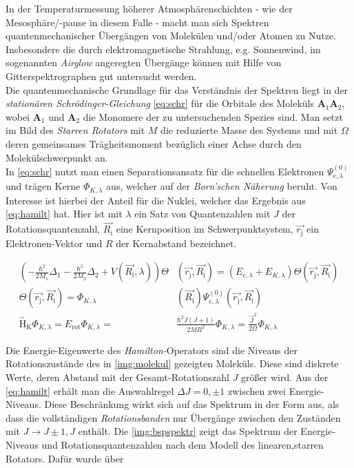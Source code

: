 \documentclass[numbers=noenddot,a4paper,notitlepage,twoside,BCOR15mm]{scrartcl}
\newcommand{\ix}[1]{_\text{#1}}
\newcommand{\tilt}[1]{\textit{#1}}
\newcommand{\fett}[1]{\textbf{#1}}
\newcommand{\OP}[1]{\hat{\mathrm{#1}}}
\begin{document}
		In der Temperaturmessung höherer Atmosphärenschichten - wie der Mesosphäre/-pause in diesem Falle -  macht man sich Spektren quantenmechanischer Übergängen von Molekülen und/oder Atomen zu Nutze. Insbesondere die durch elektromagnetische Strahlung, e.g. Sonnenwind, im sogenannten \tilt{Airglow} angeregten Übergänge können mit Hilfe von Gitterspektrographen gut untersucht werden.\\
		Die quantenmechanische Grundlage für das Verständnis der Spektren liegt in der \tilt{stationären Schrödinger-Gleichung} \autoref{eq:schr} für die Orbitale des Moleküls $\fett{A}\ix{1}\fett{A}\ix{2}$, wobei $\fett{A}\ix{1}$ und $\fett{A}\ix{2}$ die Monomere der zu untersuchenden Spezies sind. Man setzt im Bild des \tilt{Starren Rotators} mit $M$ die reduzierte Masse des Systems und mit $\Omega$ deren gemeinsames Trägheitsmoment bezüglich einer Achse durch den Molekülschwerpunkt an.\\
		In \autoref{eq:schr} nutzt man einen Separationsansatz für die schnellen Elektronen $\Psi_{e,\lambda}^{(0)}$ und trägen Kerne $\Phi_{K,\lambda}$ aus, welcher auf der \tilt{Born'schen Näherung} beruht. Von Interesse ist hierbei der Anteil für die Nuklei, welcher das Ergebnis aus \autoref{eq:hamilt} hat. Hier ist mit $\lambda$ ein Satz von Quantenzahlen mit $J$ der Rotationsquantenzahl, $\vec{R\ix{i}}$ eine Kernposition im Schwerpunktsystem, $\vec{r\ix{j}}$ ein Elektronen-Vektor und $R$ der Kernabstand bezeichnet.

			\begin{align}
				\left(-\frac{\hbar^2}{2M\ix{1}}\Delta\ix{1}-\frac{\hbar^2}{2M\ix{2}}\Delta\ix{2}+V(\vec{R\ix{i}},\lambda)\right)\Theta&(\vec{r\ix{j}},\vec{R\ix{i}})=\left(E_{e,\lambda}+E_{K,\lambda}\right)\Theta(\vec{r\ix{j}},\vec{R\ix{i}}) \label{eq:schr}\\
				\Theta(\vec{r\ix{j}},\vec{R\ix{i}})=\Phi_{K,\lambda}&(\vec{R\ix{i}})\Psi_{e,\lambda}^{(0)}(\vec{r\ix{j}},\vec{R\ix{i}}) \nonumber \\
				\OP{H}\ix{K}\Phi_{K,\lambda}=E\ix{rot}\Phi_{K,\lambda}=&\frac{\hbar^2J\left(J+1\right)}{2MR^2}\Phi_{K,\lambda}=\frac{\vec{J}^2}{2\Omega}\Phi_{K,\lambda} \label{eq:hamilt}
			\end{align}

		Die Energie-Eigenwerte des \tilt{Hamilton-}Operators sind die Niveaus der Rotationszustände des in \autoref{img:molekul} gezeigten Moleküls. Diese sind diskrete Werte, deren Abstand mit der Gesamt-Rotationszahl $J$ größer wird. Aus der \autoref{eq:hamilt} erhält man die Auswahlregel $\Delta J=0,\pm1$ zwischen zwei Energie-Niveaus. Diese Beschränkung wirkt sich auf das Spektrum in der Form aus, als dass die vollständigen \tilt{Rotationsbanden} nur Übergänge zwischen den Zuständen mit $J\rightarrow J\pm1,J$ enthält. Die \autoref{img:bspspektr} zeigt das Spektrum der Energie-Niveaus und Rotationsquantenzahlen nach dem Modell des linearen,starren Rotators. Dafür wurde über
\end{document}
